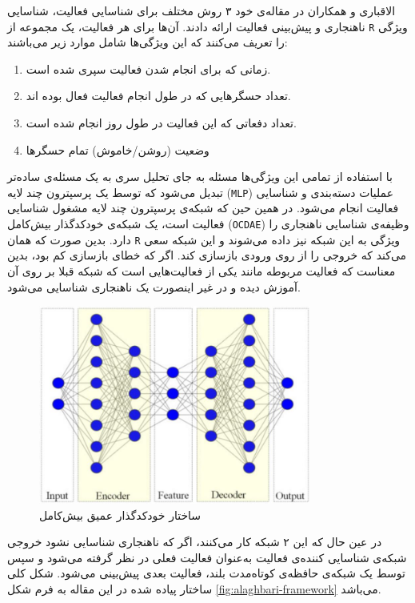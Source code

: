 الاقباری و همکاران\cite{alaghbari2022activities}
در مقاله‌ی خود ۳ روش مختلف برای شناسایی فعالیت، شناسایی ناهنجاری و پیش‌بینی فعالیت ارائه دادند. آن‌ها برای هر فعالیت، یک مجموعه از \verb|R| ویژگی را تعریف می‌کنند که این ویژگی‌ها شامل موارد زیر می‌باشند:
\begin{enumerate}
    \item زمانی که برای انجام شدن فعالیت سپری شده است.
    \item تعداد حسگرهایی که در طول انجام فعالیت فعال بوده اند.
    \item تعداد دفعاتی که این فعالیت در طول روز انجام شده است.
    \item وضعیت (روشن/خاموش) تمام حسگرها
\end{enumerate}

با استفاده از تمامی این ویژگی‌ها مسئله به جای تحلیل سری به یک مسئله‌ی ساده‌تر تبدیل می‌شود که توسط
یک پرسپترون چند لایه (\verb|MLP|)
عملیات دسته‌بندی و شناسایی فعالیت انجام می‌شود. در همین حین که شبکه‌ی پرسپترون چند لایه مشغول شناسایی فعالیت است، یک
شبکه‌ی خودکدگذار بیش‌کامل (\verb|OCDAE|)
وظیفه‌ی شناسایی ناهنجاری را دارد. بدین صورت که  همان \verb|R| ویژگی به این شبکه نیز داده می‌شوند و این شبکه سعی می‌کند که خروجی را از روی ورودی بازسازی کند. اگر که
خطای بازسازی
کم بود، بدین معناست که فعالیت مربوطه مانند یکی از فعالیت‌هایی است که شبکه قبلا بر روی آن آموزش دیده و در غیر اینصورت یک ناهنجاری شناسایی می‌شود.
\begin{figure}[htbp]
  \centering
  \includegraphics[width=0.8\textwidth]{Images/Chapter2/ocd-ae.png}
  \caption{ساختار خودکدگذار عمیق بیش‌کامل}
  \label{fig:ocd-ae}
\end{figure}
در عین حال که این ۲ شبکه کار می‌کنند، اگر که ناهنجاری شناسایی نشود خروجی شبکه‌ی شناسایی کننده‌ی فعالیت به‌عنوان فعالیت فعلی در نظر گرفته می‌شود و سپس توسط یک شبکه‌ی حافظه‌ی کوتاه‌مدت بلند، فعالیت بعدی پیش‌بینی می‌شود. شکل کلی ساختار پیاده شده در این مقاله به فرم شکل \ref{fig:alaghbari-framework} می‌باشد.
